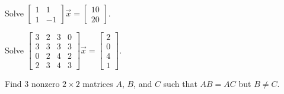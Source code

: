 \documentclass{ximera}
\begin{document}
\begin{exercise}%
    Solve
    $\left[ 
        \begin{smallmatrix}
            1 & 1 \\
            1 & -1
        \end{smallmatrix}
    \right] 
    \vec{x} = 
    \left[ 
        \begin{smallmatrix}
            10 \\ 
            20
        \end{smallmatrix}
    \right]$.
\end{exercise}


\begin{exercise}
    Solve
    $\left[ 
        \begin{smallmatrix}
            3 & 2 & 3 & 0 \\
            3 & 3 & 3 & 3 \\
            0 & 2 & 4 & 2 \\
            2 & 3 & 4 & 3 
        \end{smallmatrix} 
    \right] 
    \vec{x} =
    \left[ 
        \begin{smallmatrix}
            2 \\
            0 \\
            4 \\
            1
        \end{smallmatrix} 
    \right]$.
\end{exercise}

\begin{exercise}
    Find 3 nonzero $2 \times 2$ matrices $A$, $B$, and $C$ such that $AB = AC$ but $B \not= C$.
\end{exercise}
\end{document}
